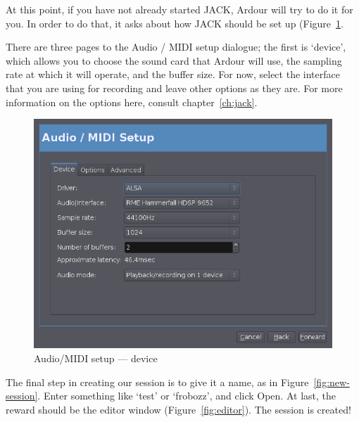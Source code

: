 \documentclass{book}
\newcommand{\button}[1]{#1}
\begin{document}
At this point, if you have not already started JACK, Ardour will try
to do it for you.  In order to do that, it asks about how JACK should
be set up (Figure~\ref{fig:audio-midi-setup-device}.

There are three pages to the Audio / MIDI setup dialogue; the first is
`device', which allows you to choose the sound card that Ardour will
use, the sampling rate at which it will operate, and the buffer size.
For now, select the interface that you are using for recording and
leave other options as they are.  For more information on the options
here, consult chapter~\ref{ch:jack}.

\begin{figure}[ht]
\begin{center}
\includegraphics[scale=0.5]{screenshots/audio-midi-setup-device.png}
\end{center}
\caption{Audio/MIDI setup --- device}
\label{fig:audio-midi-setup-device}
\end{figure}

The final step in creating our session is to give it a name, as in
Figure~\ref{fig:new-session}.  Enter something like `test' or
`frobozz', and click \button{Open}.  At last, the reward should be the
editor window (Figure~\ref{fig:editor}).  The session is created!
\end{document}
